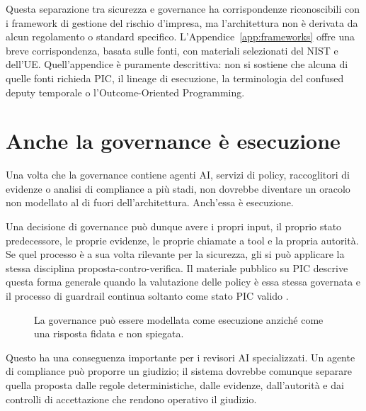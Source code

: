 \documentclass[10pt,oneside,openany]{book}
\begin{document}
Questa separazione tra sicurezza e governance ha corrispondenze riconoscibili con i framework di gestione del rischio d'impresa, ma l'architettura non è derivata da alcun regolamento o standard specifico. L'Appendice~\ref{app:frameworks} offre una breve corrispondenza, basata sulle fonti, con materiali selezionati del NIST e dell'UE. Quell'appendice è puramente descrittiva: non si sostiene che alcuna di quelle fonti richieda PIC, il lineage di esecuzione, la terminologia del confused deputy temporale o l'Outcome-Oriented Programming.

\chapter{Anche la governance è esecuzione}

Una volta che la governance contiene agenti AI, servizi di policy, raccoglitori di evidenze o analisi di compliance a più stadi, non dovrebbe diventare un oracolo non modellato al di fuori dell'architettura. Anch'essa è esecuzione.

Una decisione di governance può dunque avere i propri input, il proprio stato predecessore, le proprie evidenze, le proprie chiamate a tool e la propria autorità. Se quel processo è a sua volta rilevante per la sicurezza, gli si può applicare la stessa disciplina proposta-contro-verifica. Il materiale pubblico su PIC descrive questa forma generale quando la valutazione delle policy è essa stessa governata e il processo di guardrail continua soltanto come stato PIC valido \cite{picwhy}.

\begin{figure}[ht]
\centering
{}
\caption{La governance può essere modellata come esecuzione anziché come una risposta fidata e non spiegata.}
\end{figure}

Questo ha una conseguenza importante per i revisori AI specializzati. Un agente di compliance può proporre un giudizio; il sistema dovrebbe comunque separare quella proposta dalle regole deterministiche, dalle evidenze, dall'autorità e dai controlli di accettazione che rendono operativo il giudizio.
\end{document}
